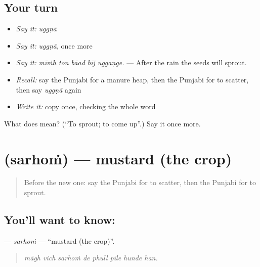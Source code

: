 \subsection*{Your turn}
\begin{itemize}
\raggedright
  \item \emph{Say it:} \emph{uggṇā}
  \item \emph{Say it:} \emph{uggṇā}, once more
  \item \emph{Say it:} \emph{mīṁh ton bāad bīj uggaṇge.} — After the rain the seeds will sprout.
  \item \emph{Recall:} say the Punjabi for a manure heap, then the Punjabi for to scatter, then say \emph{uggṇā} again
  \item \emph{Write it:} copy \textbf{} once, checking the whole word
\end{itemize}

\begin{tcolorbox}[breakable,colback=teal!4,colframe=teal!35!black,title={Before you move on}]
What does  mean? (\textquotedblleft{}To sprout; to come up\textquotedblright{}.) Say it once more.
\end{tcolorbox}
\section[\texorpdfstring{\pa{ਸਰ੍ਹੋਂ} (sarhoṁ)}{ਸਰ੍ਹੋਂ (sarhoṁ)}]{ (sarhoṁ) — mustard (the crop)}

\label{lesson:PA-C302-sarhom}



\begin{quote}
Before the new one: say the Punjabi for to scatter, then the Punjabi for to sprout.
\end{quote}

\subsection*{You'll want to know: }
\textbf{} — \emph{sarhoṁ} — \textquotedblleft{}mustard (the crop)\textquotedblright{}.

\begin{quote}
       
\end{quote}

\begin{quote}
\emph{māgh vich sarhoṁ de phull pīle hunde han.}
\end{quote}

